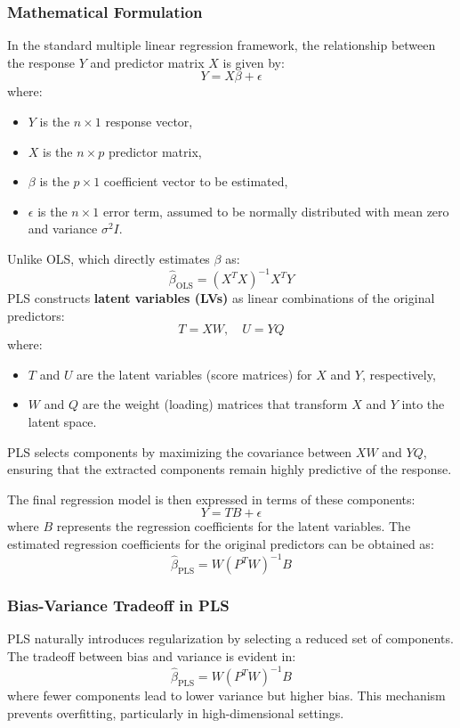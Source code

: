 \documentclass[11pt,twoside,a4paper]{article}
\begin{document}
\subsubsection{Mathematical Formulation}
In the standard multiple linear regression framework, the relationship between the response \( Y \) and predictor matrix \( X \) is given by:
\[
Y = X \beta + \epsilon
\]
where:
\begin{itemize}
    \item \( Y \) is the \( n \times 1 \) response vector,
    \item \( X \) is the \( n \times p \) predictor matrix,
    \item \( \beta \) is the \( p \times 1 \) coefficient vector to be estimated,
    \item \( \epsilon \) is the \( n \times 1 \) error term, assumed to be normally distributed with mean zero and variance \( \sigma^2 I \).
\end{itemize}

Unlike OLS, which directly estimates \( \beta \) as:
\[
\hat{\beta}_{\text{OLS}} = (X^T X)^{-1} X^T Y
\]
PLS constructs \textbf{latent variables (LVs)} as linear combinations of the original predictors:
\[
T = XW, \quad U = YQ
\]
where:
\begin{itemize}
    \item \( T \) and \( U \) are the latent variables (score matrices) for \( X \) and \( Y \), respectively,
    \item \( W \) and \( Q \) are the weight (loading) matrices that transform \( X \) and \( Y \) into the latent space.
\end{itemize}

PLS selects components by maximizing the covariance between \( XW \) and \( YQ \), ensuring that the extracted components remain highly predictive of the response.

The final regression model is then expressed in terms of these components:
\[
Y = T B + \epsilon
\]
where \( B \) represents the regression coefficients for the latent variables. The estimated regression coefficients for the original predictors can be obtained as:
\[
\hat{\beta}_{\text{PLS}} = W (P^T W)^{-1} B
\]

\subsubsection{Bias-Variance Tradeoff in PLS}
PLS naturally introduces regularization by selecting a reduced set of components. The tradeoff between bias and variance is evident in:
\[
\hat{\beta}_{\text{PLS}} = W (P^T W)^{-1} B
\]
where fewer components lead to lower variance but higher bias. This mechanism prevents overfitting, particularly in high-dimensional settings.
\end{document}
